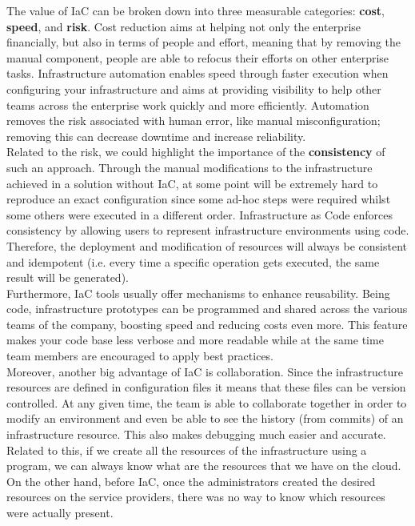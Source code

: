 The value of IaC can be broken down into three measurable categories: \textbf{cost}, \textbf{speed}, and \textbf{risk}.
Cost reduction aims at helping not only the enterprise financially, but also in terms of people and effort, meaning that by removing the manual component, people are able to refocus their efforts on other enterprise tasks.
Infrastructure automation enables speed through faster execution when configuring your infrastructure and aims at providing visibility to help other teams across the enterprise work quickly and more efficiently.
Automation removes the risk associated with human error, like manual misconfiguration; removing this can decrease downtime and increase reliability.\\
Related to the risk, we could highlight the importance of the \textbf{consistency} of such an approach.
Through the manual modifications to the infrastructure achieved in a solution without IaC, at some point will be extremely hard to reproduce an exact configuration since some ad-hoc steps were required
whilst some others were executed in a different order.
Infrastructure as Code enforces consistency by allowing users to represent infrastructure environments using code.
Therefore, the deployment and modification of resources will always be consistent and idempotent (i.e. every time a specific operation gets executed, the same result will be generated).\\
Furthermore, IaC tools usually offer mechanisms to enhance reusability.
Being code, infrastructure prototypes can be programmed and shared across the various teams of the company, boosting speed and reducing costs even more.
This feature makes your code base less verbose and more readable while at the same time team members are encouraged to apply best practices.\\
Moreover, another big advantage of IaC is collaboration.
Since the infrastructure resources are defined in configuration files it means that these files can be version controlled.
At any given time, the team is able to collaborate together in order to modify an environment and even be able to see the history (from commits) of an infrastructure resource.
This also makes debugging much easier and accurate.\\
Related to this, if we create all the resources of the infrastructure using a program, we can always know what are the resources that we have on the cloud.
On the other hand, before IaC, once the administrators created the desired resources on the service providers, there was no way to know which resources were actually present.
